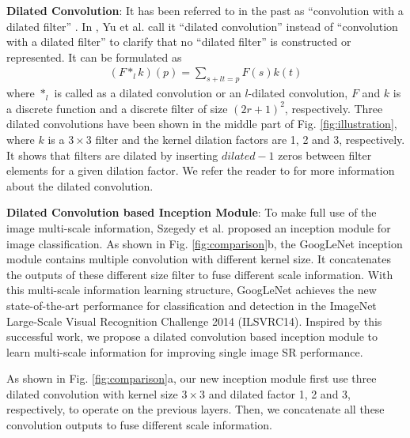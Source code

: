 \documentclass{article}
\begin{document}
\textbf{Dilated Convolution}: It has been referred to in the past as “convolution with a dilated filter” \cite{ref11, ref12}. In \cite{ref13}, Yu et al. call it “dilated convolution” instead of “convolution with a dilated filter” to clarify that no “dilated filter” is constructed or represented. It can be formulated as
\begin{eqnarray}
\left( {F{ * _l}k} \right)\left( p \right) = \sum\nolimits_{s + lt = p} {F\left( s \right)k\left( t \right)}
\end{eqnarray}
where ${{ * _l}}$ is called as a dilated convolution or an $l$-dilated convolution, $F$ and $k$ is a discrete function and a discrete filter of size ${\left( {2r + 1} \right)^2}$, respectively. Three dilated convolutions have been shown in the middle part of Fig. \ref{fig:illustration}, where $k$ is a $3 \times 3$ filter and the kernel dilation factors are 1, 2 and 3, respectively. It shows that filters are dilated by inserting $dilated - 1$ zeros between filter elements for a given dilation factor. We refer the reader to \cite{ref13} for more information about the dilated convolution.

\textbf{Dilated Convolution based Inception Module}: To make full use of the image multi-scale information, Szegedy et al. \cite{ref14} proposed an inception module for image classification. As shown in Fig. \ref{fig:comparison}b, the GoogLeNet inception module contains multiple convolution with different kernel size. It concatenates the outputs of these different size filter to fuse different scale information. With this multi-scale information learning structure, GoogLeNet achieves the new state-of-the-art performance for classification and detection in the ImageNet Large-Scale Visual Recognition Challenge 2014 (ILSVRC14). Inspired by this successful work, we propose a dilated convolution based inception module to learn multi-scale information for improving single image SR performance.

As shown in Fig. \ref{fig:comparison}a, our new inception module first use three dilated convolution with kernel size $3 \times 3$ and dilated factor 1, 2 and 3, respectively, to operate on the previous layers. Then, we concatenate all these convolution outputs to fuse different scale information.
\end{document}
